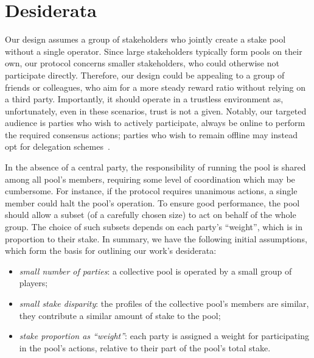 \section{Desiderata}\label{sec:collective-pool-desiderata}

Our design assumes a group of stakeholders who jointly create a stake pool
without a single operator. Since large stakeholders typically form pools on
their own, our protocol concerns smaller stakeholders, who could otherwise not
participate directly. Therefore, our design could \eg be appealing to a group
of friends or colleagues, who aim for a more steady reward ratio without
relying on a third party. Importantly, it should operate in a trustless environment as,
unfortunately, even in these scenarios, trust is not
a given. Notably, our targeted audience is parties who wish to
actively participate, \ie always be online to perform the required consensus
actions; parties who wish to remain offline may instead opt for delegation
schemes~\cite{eosWhitepaper,SCN:KarKiaLar20}.

In the absence of a central party, the responsibility of running the pool is
shared among all pool's members, requiring some level of coordination which may
be cumbersome. For instance, if the protocol requires unanimous actions, a
single member could halt the pool's operation. To ensure good performance, the
pool should allow a subset (of a carefully chosen size) to act on behalf of the
whole group. The choice of such subsets depends on each party's ``weight'',
which is in proportion to their stake.  In summary, we have the following
initial assumptions, which form the basis for outlining our work's desiderata:

\begin{itemize}[noitemsep]
    \item \emph{small number of parties}: a collective pool is operated by a
        small group of players;

    \item \emph{small stake disparity}: the profiles of the collective pool's
        members are similar, \ie they contribute a similar amount of stake to
        the pool;

    \item \emph{stake proportion as ``weight''}: each party is assigned a
        weight for participating in the pool's actions, relative to their part
        of the pool's total stake.
\end{itemize}

